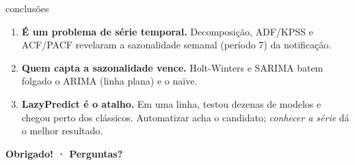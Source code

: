 \documentclass[aspectratio=169,11pt]{beamer}
\newcommand{\dest}[1]{\textcolor{emph}{\textbf{#1}}}
\begin{document}
\begin{frame}{conclusões}
  \begin{enumerate}
    \item \dest{É um problema de série temporal.} Decomposição, ADF/KPSS e ACF/PACF
          revelaram a sazonalidade semanal (período 7) da notificação.
    \item \dest{Quem capta a sazonalidade vence.} Holt-Winters e SARIMA batem folgado o
          ARIMA (linha plana) e o naïve.
    \item \dest{LazyPredict é o atalho.} Em uma linha, testou dezenas de modelos e chegou
          perto dos clássicos. Automatizar acha o candidato; \emph{conhecer a série} dá o melhor resultado.
  \end{enumerate}
  \vfill
  \begin{center}
    \begin{tcolorbox}[alertbox,width=0.5\paperwidth,halign=center]
      {\ttfamily\bfseries\Large Obrigado! · Perguntas?}
    \end{tcolorbox}
  \end{center}
\end{frame}
\end{document}
